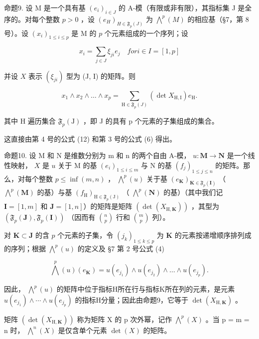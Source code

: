 命题9. 设 M 是一个具有基 \((e_i)_{i \in J}\) 的 A-模（有限或非有限），其指标集 J 是全序的。对每个整数 \(p > 0\) ，设 \((e_H)_{H \in \mathfrak{F}_p(J)}\) 为 \(\bigwedge^p(M)\) 的相应基（§7，第 8 号）。设 \((x_i)_{1 \leqslant i \leqslant p}\) 是 M 的 \(p\) 个元素组成的一个序列；设

\[
x _ {i} = \sum_ {j \in J} \xi_ {j i} e _ {j} \quad for i \in I = [1, p]
\]

并设 \(X\) 表示 \((\xi_{ji})\) 型为 (J, I) 的矩阵。则

\[
x _ {1} \wedge x _ {2} \wedge \dots \wedge x _ {p} = \sum_ {\mathrm{H} \in \mathfrak {F} _ {p} (J)} (\det X _ {\mathrm{H,I}}) e _ {\mathrm{H}}.\tag{17}
\]

其中 H 遍历集合 \(\mathfrak{F}_{p}(\mathrm{J})\) ，即 J 的具有 p 个元素的子集组成的集合。

这直接由第 4 号的公式 (12) 和第 3 号的公式 (6) 得出。

命题10. 设 M 和 N 是维数分别为 m 和 n 的两个自由 A-模， \(u: \mathbf{M} \to \mathbf{N}\) 是一个线性映射， \(X\) 是 \(u\) 关于 M 的基 \((e_i)_{1 \leqslant i \leqslant m}\) 与 N 的基 \((f_j)_{1 \leqslant j \leqslant n}\) 的矩阵。那么，对每个整数 \(p \leqslant \inf(m, n)\) ， \(\bigwedge^p(u)\) 关于基 \((e_{\mathbf{K}})_{\mathbf{K} \in \mathfrak{F}_p(\mathbf{I})}\) （ \(\bigwedge^p(\mathbf{M})\) 的基）与基 \((f_{\mathrm{H}})_{\mathrm{H} \in \mathfrak{F}_p(\mathrm{J})}\) （ \(\bigwedge^p(\mathbf{N})\) 的基）（其中我们记 \(\mathbf{I} = [1, m]\) 和 \(\mathbf{J} = [1, n]\)）的矩阵是矩阵 \((\det(X_{\mathrm{H},\mathbf{K}}))\) ，其型为 \((\mathfrak{F}_p(\mathbf{J}), \mathfrak{F}_p(\mathbf{I}))\) （因而有 \(\binom{n}{p}\) 行和 \(\binom{m}{p}\) 列）。

对 \(\mathbf{K} \subset \mathbf{J}\) 的含 \(p\) 个元素的子集，令 \((j_k)_{1 \leqslant k \leqslant p}\) 为 \(\mathbf{K}\) 的元素按递增顺序排列成的序列；根据 \(\bigwedge^p(u)\) 的定义及 §7 第 2 号公式 (4)

\[
\bigwedge^ {p} (u) \left(e _ {\mathbf {K}}\right) = u \left(e _ {j _ {1}}\right) \wedge u \left(e _ {j _ {2}}\right) \wedge \dots \wedge u \left(e _ {j _ {p}}\right).
\]

因此， \(\bigwedge^{p}(u)\) 的矩阵中位于指标H所在行与指标K所在列的元素，是元素 \(u(e_{j_1}) \wedge \cdots \wedge u(e_{j_p})\) 的指标H分量；因此由命题9，它等于 \(\det(X_{\mathrm{H},\mathbf{K}})\) 。

矩阵 \((\det(X_{\mathrm{H},\mathbf{K}}))\) 称为矩阵 X 的 p 次外幂，记作 \(\bigwedge^{p}(X)\) 。当 p = m = n 时， \(\bigwedge^{n}(X)\) 是仅含单个元素 \(\det(X)\) 的矩阵。

